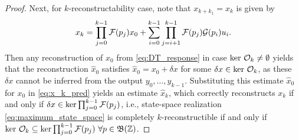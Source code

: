 \begin{proof}
    Next, for $k$-reconstructability case, note that $x_{k+k_1} = x_{k}$ is given by
    \begin{equation}
        x_k = \prod_{j=0}^{k-1} \mathcal{F}(p_j) x_0 + \sum_{i=0}^{k-1} \prod_{j=i+1}^{k-1} \mathcal{F}(p_j) \mathcal{G}(p_i) u_i.
        \label{eq:x_k_pred}
    \end{equation}
    Then any reconstruction of $x_0$ from \eqref{eq:DT_response} in case $\text{ker}\ \mathcal{O}_k \neq \emptyset$ yields that the reconstruction $\hat{x}_0$ satisfies $\hat{x}_0 = x_0 + \delta x $ for some $\delta x \in \text{ker}\ \mathcal{O}_k$, as these $\delta x$ cannot be inferred from the output $y_0,\ldots,y_{k-1}$.
    Substituting this estimate $\hat{x}_0$ for $x_0$ in \eqref{eq:x_k_pred} yields an estimate $\hat{x}_k$, which correctly reconstructs $x_k$ if and only if $\delta x \in \text{ker}\prod_{j=0}^{k-1} \mathcal{F}(p_j)$, i.e., state-space realization \eqref{eq:maximum_state_space} is completely $k$-reconstructible if and only if $\text{ker}\ \mathcal{O}_k \subseteq \text{ker} \prod_{j=0}^{k-1} \mathcal{F}(p_j) \ \forall p \in \mathfrak{B}(\mathbb{Z})$.
\end{proof}

